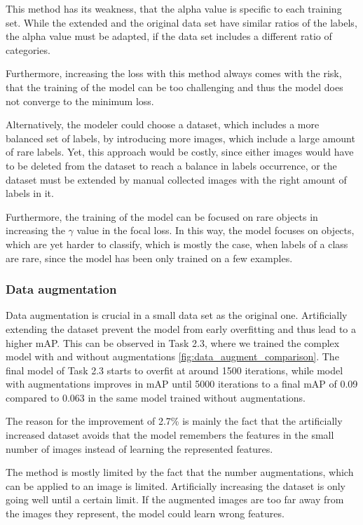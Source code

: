 \documentclass{article}
\begin{document}
This method has its weakness, that the alpha value is specific to each training set. While the extended and the original data set have similar ratios of the labels, the alpha value must be adapted, if the data set includes a different ratio of categories.

Furthermore, increasing the loss with this method always comes with the risk, that the training of the model can be too challenging and thus the model does not converge to the minimum loss.

Alternatively, the modeler could choose a dataset, which includes a more balanced set of labels, by introducing more images, which include a large amount of rare labels. Yet, this approach would be costly, since either images would have to be deleted from the dataset to reach a balance in labels occurrence, or the dataset must be extended by manual collected images with the right amount of labels in it.

Furthermore, the training of the model can be focused on rare objects in increasing the $\gamma$ value in the focal loss. In this way, the model focuses on objects, which are yet harder to classify, which is mostly the case, when labels of a class are rare, since the model has been only trained on a few examples. 

\subsubsection*{Data augmentation}

Data augmentation is crucial in a small data set as the original one. Artificially extending the dataset prevent the model from early overfitting and thus lead to a higher mAP. This can be observed in Task 2.3, where we trained the complex model with and without augmentations \ref{fig:data_augment_comparison}. The final model of Task 2.3 starts to overfit at around 1500 iterations, while model with augmentations improves in mAP until 5000 iterations to a final mAP of 0.09 compared to 0.063 in the same model trained without augmentations. 

The reason for the improvement of 2.7\% is mainly the fact that the artificially increased dataset avoids that the model remembers the features in the small number of images instead of learning the represented features.

The method is mostly limited by the fact that the number augmentations, which can be applied to an image is limited. Artificially increasing the dataset is only going well until a certain limit. If the augmented images are too far away from the images they represent, the model could learn wrong features.
\end{document}
